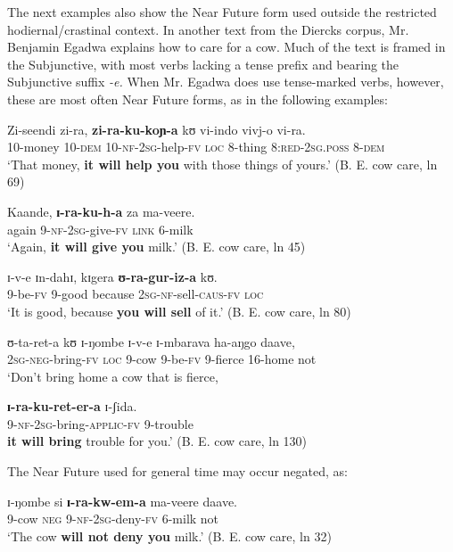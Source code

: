 \documentclass[output=paper]{langsci/langscibook}
\begin{document}
The next examples also show the Near Future form used outside the restricted hodiernal/crastinal context. In another text from the Diercks corpus, Mr. Benjamin Egadwa explains how to care for a cow. Much of the text is framed in the Subjunctive, with most verbs lacking a tense prefix and bearing the Subjunctive suffix \textit{-e.} When Mr. Egadwa does use tense-marked verbs, however, these are most often Near Future forms, as in the following examples: 

\ea\label{ex:sarvasy:4}
\gll Zi-seendi   zi-ra,     \textbf{zi-ra-ku-koɲ-a}   kʊ   vi-indo   vivj-o       vi-ra. \\
10-money  10-\textsc{dem}  10-\textsc{nf-2sg}-help-\textsc{fv}  \textsc{loc}  8-thing  8:\textsc{red-2sg.poss}  8-\textsc{dem} \\
\glt ‘That money, \textbf{it will help you} with those things of yours.’ (B. E. cow care, ln 69)
\z

\ea\label{ex:sarvasy:5}
\gll Kaande,   \textbf{ɪ-ra-ku-h-a}     za   ma-veere. \\
again  9-\textsc{nf-2sg}-give-\textsc{fv} \textsc{link}  6-milk \\
\glt ‘Again, \textbf{it will give you} milk.’ (B. E. cow care, ln 45)
\z

\ea\label{ex:sarvasy:6}
\gll ɪ-v-e   ɪn-dahɪ,   kɪgera   \textbf{ʊ-ra-gur-iz-a}       kʊ. \\
9-be-\textsc{fv}  9-good  because  \textsc{2sg-nf}-sell-\textsc{caus-fv}  \textsc{loc} \\
\glt ‘It is good, because \textbf{you will sell} of it.’ (B. E. cow care, ln 80)
\z 

\ea\label{ex:sarvasy:7}
\gll ʊ-ta-ret-a     kʊ   ɪ-ŋombe   ɪ-v-e     ɪ-mbarava   ha-aŋgo   daave, \\ 
\textsc{2sg-neg}-bring-\textsc{fv}  \textsc{loc}  9-cow    9-be-\textsc{fv}  9-fierce  16-home  not \\ 
\glt ‘Don’t bring home a cow that is fierce, 

\gll \textbf{ɪ-ra-ku-ret-er-a}     ɪ-ʃida. \\
9-\textsc{nf-2sg-}bring-\textsc{applic-fv} 9-trouble \\
\glt \textbf{it will bring} trouble for you.’ (B. E. cow care, ln 130)
\z 

The Near Future used for general time may occur negated, as:

\ea\label{ex:sarvasy:8}
\gll ɪ-ŋombe   si  \textbf{ɪ-ra-kw-em-a}   ma-veere   daave. \\
9-cow  \textsc{neg}  \textsc{9-nf-2sg}-deny-\textsc{fv}  6-milk    not \\
\glt ‘The cow \textbf{will not deny you} milk.’ (B. E. cow care, ln 32)
\z
\end{document}
